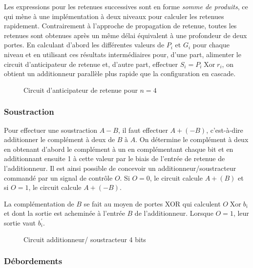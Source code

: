 \documentclass[11pt]{article}
\begin{document}
Les expressions pour les retenues successives sont en forme \emph{somme de
produits}, ce qui mène à une implémentation à deux niveaux pour
calculer les retenues rapidement. Contrairement à l'approche de
propagation de retenue, toutes les retenues sont obtenues après un
même délai équivalent à une profondeur de deux portes.  En calculant
d'abord les différentes valeurs de \(P_i\) et \(G_i\) pour chaque
niveau et en utilisant ces résultats intermédiaires pour, d'une part,
alimenter le circuit d'anticipateur de retenue et, d'autre part,
effectuer \(S_i = P_i  \operatorname{Xor} r_i\), on obtient un additionneur parallèle
plus rapide que la configuration en cascade.

\begin{figure}[htbp]
\centering

\caption{\label{fig:org9452778}Circuit d'anticipateur de retenue pour \(n= 4\)}
\end{figure}


\subsubsection{Soustraction}
\label{sec:orgdf1e9ce}

Pour effectuer une soustraction \(A - B\), il faut effectuer \(A +
(-B)\), c'est-à-dire additionner le complément à deux de \(B\) à
\(A\). On détermine le complément à deux en obtenant d'abord le
complément à un en complémentant chaque bit et en additionnant ensuite
1 à cette valeur par le biais de l'entrée de retenue de l'additionneur. Il
est ainsi possible de concevoir un additionneur/soustracteur commandé
par un signal de contrôle \(O\). Si \(O=0\), le circuit calcule \(A +
(B)\) et si \(O=1\), le circuit calcule \(A + (-B)\).

La complémentation de \(B\) se fait au moyen de portes XOR qui
calculent \(O \operatorname{Xor} b_i\) et dont la sortie est acheminée
à l'entrée \(B\) de l'additionneur. Lorsque \(O=1\), leur sortie vaut
\(b_i^\prime\).

\begin{figure}[htbp]
\centering

\caption{\label{fig:org7caab48}Circuit additionneur/ soustracteur 4 bits}
\end{figure}

\subsubsection{Débordements}
\label{sec:org1eb4c18}
\end{document}
